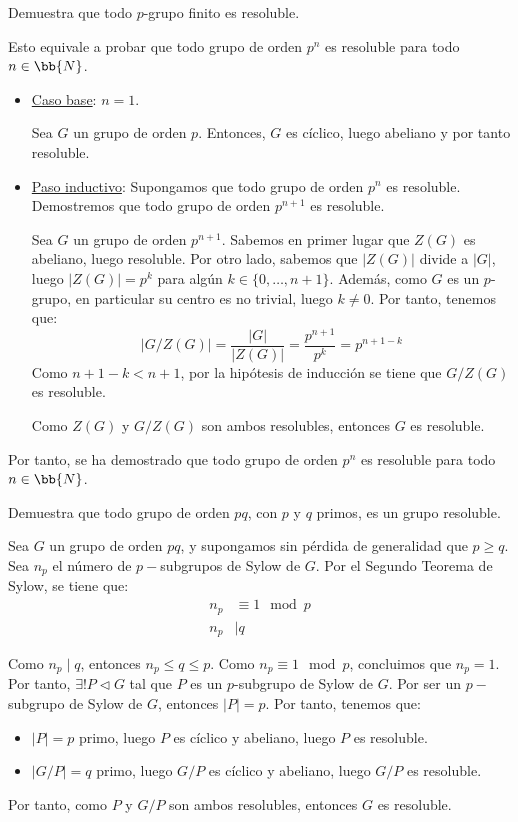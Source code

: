 \begin{ejercicio}
    Demuestra que todo $p$-grupo finito es resoluble.


    Esto equivale a probar que todo grupo de orden $p^n$ es resoluble para todo $n\in\bb{N}$.
    \begin{itemize}
        \item \ul{Caso base}: $n=1$.
        
        Sea $G$ un grupo de orden $p$. Entonces, $G$ es cíclico, luego abeliano y por tanto resoluble.

        \item \ul{Paso inductivo}: Supongamos que todo grupo de orden $p^n$ es resoluble. Demostremos que todo grupo de orden $p^{n+1}$ es resoluble.
        
        Sea $G$ un grupo de orden $p^{n+1}$. 
        Sabemos en primer lugar que $Z(G)$ es abeliano, luego resoluble.
        Por otro lado, sabemos que $|Z(G)|$ divide a $|G|$, luego $|Z(G)|=p^k$ para algún $k\in\{0,\ldots,n+1\}$.
        Además, como $G$ es un $p$-grupo, en particular su centro es no trivial, luego $k\neq 0$.
        Por tanto, tenemos que:
        \begin{equation*}
            \left|G/Z(G)\right| = \dfrac{|G|}{|Z(G)|} = \dfrac{p^{n+1}}{p^k} = p^{n+1-k}
        \end{equation*}
        Como $n+1-k<n+1$, por la hipótesis de inducción se tiene que $G/Z(G)$ es resoluble.

        Como $Z(G)$ y $G/Z(G)$ son ambos resolubles, entonces $G$ es resoluble.
    \end{itemize}

    Por tanto, se ha demostrado que todo grupo de orden $p^n$ es resoluble para todo $n\in\bb{N}$.
\end{ejercicio}

\begin{ejercicio}
    Demuestra que todo grupo de orden $pq$, con $p$ y $q$ primos, es un grupo resoluble.

    Sea $G$ un grupo de orden $pq$, y supongamos sin pérdida de generalidad que $p\geq q$. Sea $n_p$ el número de $p-$subgrupos de Sylow de $G$. Por el Segundo Teorema de Sylow, se tiene que:
    \begin{align*}
        n_p &\equiv 1 \mod p \\
        n_p &\mid q
    \end{align*}

    Como $n_p\mid q$, entonces $n_p\leq q\leq p$. Como $n_p\equiv 1 \mod p$, concluimos que $n_p=1$. Por tanto, $\exists! P\lhd G$ tal que $P$ es un $p$-subgrupo de Sylow de $G$. Por ser un $p-$subgrupo de Sylow de $G$, entonces $|P|=p$. Por tanto, tenemos que:
    \begin{itemize}
        \item $|P|=p$ primo, luego $P$ es cíclico y abeliano, luego $P$ es resoluble.
        \item $|G/P|=q$ primo, luego $G/P$ es cíclico y abeliano, luego $G/P$ es resoluble.
    \end{itemize}
    Por tanto, como $P$ y $G/P$ son ambos resolubles, entonces $G$ es resoluble.
\end{ejercicio}

